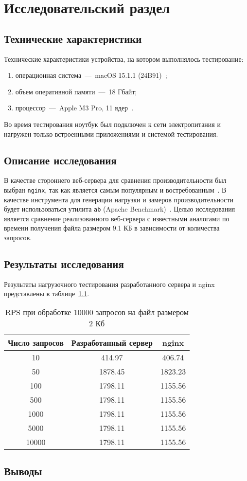 \chapter{Исследовательский раздел}

\section{Технические характеристики}

Технические характеристики устройства, на котором выполнялось тестирование:
\begin{enumerate}
	\item операционная система~---~macOS 15.1.1 (24B91)~\cite{macos}; 
	\item объем оперативной памяти~---~18 Гбайт;
	\item процессор~---~Apple M3 Pro, 11 ядер~\cite{macos}.
\end{enumerate}

Во время тестирования ноутбук был подключен к сети электропитания и нагружен только встроенными приложениями и системой тестирования.

\section{Описание исследования}

В качестве стороннего веб-сервера для сравнения производительности был выбран \texttt{nginx}, так как является самым популярным и востребованным~\cite{nginx}.
В качестве инструмента для генерации нагрузки и замеров производительности будет использоваться утилита \texttt{ab} (Apache Benchmark)~\cite{ab}.
Целью исследования является сравнение реализованного веб-сервера с известными аналогами по времени получения файла размером 9.1 КБ в зависимости от количества запросов.

\section{Результаты исследования}

Результаты нагрузочного тестирования разработанного сервера и nginx представлены в таблице~\ref{tab:1}.

\begin{table}[H]
	\centering
	\caption{RPS при обработке 10000 запросов на файл размером 2 Кб}
	\label{tab:1}
	\begin{tabular}{|c|c|c|}
		\hline
		Число запросов & Разработанный сервер & nginx \\ \hline
		10 & 414.97 & 406.74 \\ \hline
		50 & 1878.45 & 1823.23 \\ \hline
		100 & 1798.11 & 1155.56 \\ \hline
		500 & 1798.11 & 1155.56 \\ \hline
		1000 & 1798.11 & 1155.56 \\ \hline
		5000 & 1798.11 & 1155.56 \\ \hline
		10000 & 1798.11 & 1155.56 \\ \hline
	\end{tabular}
\end{table}

\section*{Выводы}